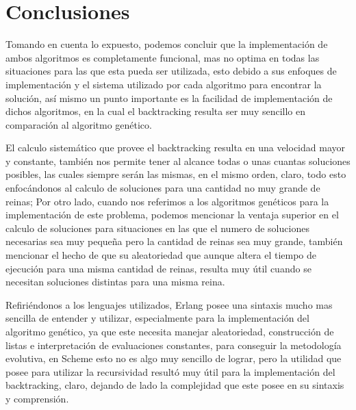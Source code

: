 \documentclass[12pt,a4paper]{article}
\begin{document}
\section{Conclusiones}

Tomando en cuenta lo expuesto, podemos concluir que la implementación de ambos algoritmos es completamente funcional, mas no optima en todas las situaciones para las que esta pueda ser utilizada, esto debido a sus enfoques de implementación y el sistema utilizado por cada algoritmo para encontrar la solución, así mismo un punto importante es la facilidad de implementación de dichos algoritmos, en la cual el backtracking resulta ser muy sencillo en comparación al algoritmo genético.

El calculo sistemático que provee el backtracking resulta en una velocidad mayor y constante, también nos permite tener al alcance todas o unas cuantas  soluciones posibles, las cuales siempre serán las mismas, en el mismo orden, claro, todo esto enfocándonos al calculo de soluciones para una cantidad no muy grande de reinas; Por otro lado, cuando nos referimos a los algoritmos genéticos para la implementación de este problema, podemos mencionar la ventaja superior en el calculo de soluciones para situaciones en las que el numero de soluciones necesarias sea muy pequeña pero la cantidad de reinas sea muy grande, también mencionar el hecho de que su aleatoriedad que aunque altera el tiempo de ejecución para una misma cantidad de reinas,  resulta muy útil cuando se necesitan soluciones distintas para una misma reina.

Refiriéndonos a los lenguajes utilizados, Erlang posee una sintaxis mucho mas sencilla de entender y utilizar, especialmente para la implementación del algoritmo genético, ya que este necesita manejar aleatoriedad, construcción de listas e interpretación de evaluaciones constantes, para conseguir la metodología evolutiva, en Scheme esto no es algo muy sencillo de lograr, pero la utilidad que posee para utilizar la recursividad resultó muy útil para la implementación del backtracking, claro, dejando de lado la complejidad que este posee en su sintaxis y comprensión.
\end{document}
